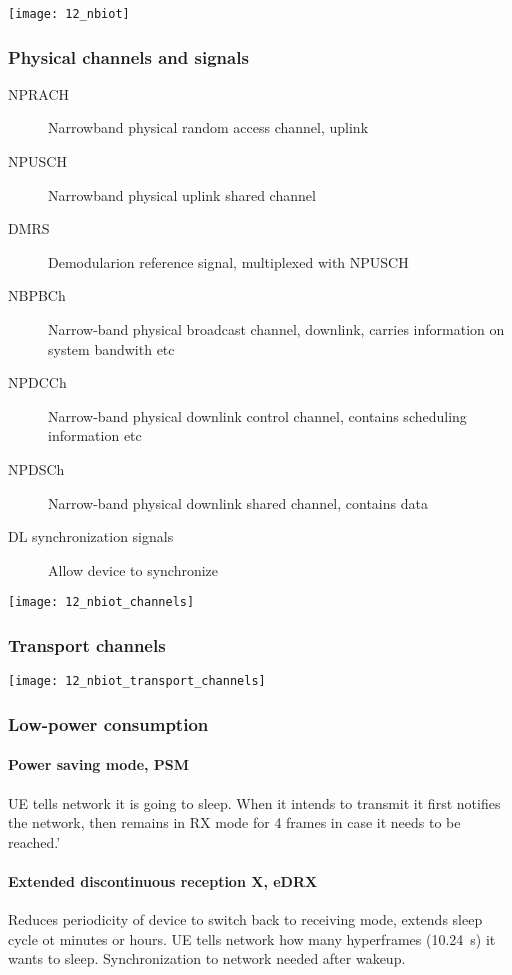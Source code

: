 \texttt{[image: 12\_nbiot]}

\subsubsection{Physical channels and signals}

\begin{description}
		\item[NPRACH] Narrowband physical random access channel, uplink
		\item[NPUSCH] Narrowband physical uplink shared channel
		\item[DMRS] Demodularion reference signal, multiplexed with NPUSCH
		\item[NBPBCh] Narrow-band physical broadcast channel, downlink,
				carries information on system bandwith etc
		\item[NPDCCh] Narrow-band physical downlink control channel, contains
				scheduling information etc
		\item[NPDSCh] Narrow-band physical downlink shared channel, contains data
		\item[DL synchronization signals] Allow device to synchronize
\end{description}

\texttt{[image: 12\_nbiot\_channels]}

\subsubsection{Transport channels}

\texttt{[image: 12\_nbiot\_transport\_channels]}

\subsubsection{Low-power consumption}

\paragraph{Power saving mode, PSM}

UE tells network it is going to sleep. When it intends to transmit it first
notifies the network, then remains in RX mode for 4 frames in case it needs to
be reached.'

\paragraph{Extended discontinuous reception X, eDRX}

Reduces periodicity of device to switch back to receiving mode, extends sleep
cycle ot minutes or hours. UE tells network how many hyperframes
(\SI{10.24}{\second}) it wants to sleep. Synchronization to network needed
after wakeup.
